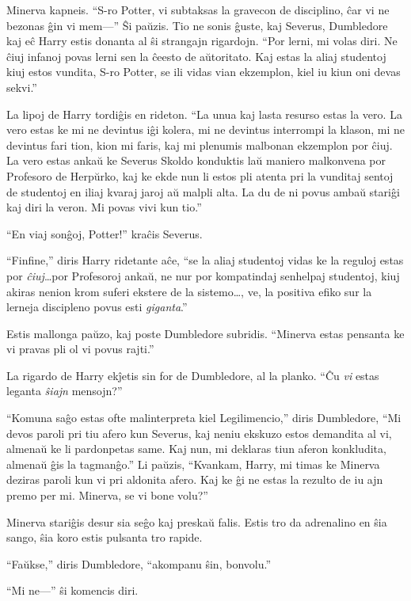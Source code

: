 Minerva kapneis. ``S-ro Potter, vi subtaksas la gravecon de
disciplino, ĉar vi ne bezonas ĝin vi mem—'' Ŝi paŭzis. Tio ne sonis
ĝuste, kaj Severus, Dumbledore kaj eĉ Harry estis donanta al ŝi
strangajn rigardojn. ``Por lerni, mi volas diri. Ne ĉiuj infanoj povas
lerni sen la ĉeesto de aŭtoritato. Kaj estas la aliaj studentoj kiuj
estos vundita, S-ro Potter, se ili vidas vian ekzemplon, kiel iu kiun
oni devas sekvi.''

La lipoj de Harry tordiĝis en rideton. ``La unua kaj lasta resurso
estas la vero. La vero estas ke mi ne devintus iĝi kolera, mi ne
devintus interrompi la klason, mi ne devintus fari tion, kion mi
faris, kaj mi plenumis malbonan ekzemplon por ĉiuj. La vero estas
ankaŭ ke Severus Skoldo konduktis laŭ maniero malkonvena por Profesoro
de Herpŭrko, kaj ke ekde nun li estos pli atenta pri la vunditaj
sentoj de studentoj en iliaj kvaraj jaroj aŭ malpli alta. La du de ni
povus ambaŭ stariĝi kaj diri la veron. Mi povas vivi kun tio.''

``En viaj sonĝoj, Potter!'' kraĉis Severus.

``Finfine,'' diris Harry ridetante aĉe, ``se la aliaj studentoj vidas
ke la reguloj estas por \emph{ĉiuj}\ldots por Profesoroj ankaŭ, ne
nur por kompatindaj senhelpaj studentoj, kiuj akiras nenion krom
suferi ekstere de la sistemo\ldots, ve, la positiva efiko sur la
lerneja discipleno povus esti \emph{giganta}.''

Estis mallonga paŭzo, kaj poste Dumbledore subridis. ``Minerva estas
pensanta ke vi pravas pli ol vi povus rajti.''

La rigardo de Harry ekĵetis sin for de Dumbledore, al la planko. ``Ĉu
\emph{vi} estas leganta \emph{ŝiajn} mensojn?''

``Komuna saĝo estas ofte malinterpreta kiel Legilimencio,'' diris
Dumbledore, ``Mi devos paroli pri tiu afero kun Severus, kaj neniu
ekskuzo estos demandita al vi, almenaŭ ke li pardonpetas same. Kaj
nun, mi deklaras tiun aferon konkludita, almenaŭ ĝis la tagmanĝo.'' Li
paŭzis, ``Kvankam, Harry, mi timas ke Minerva deziras paroli kun vi
pri aldonita afero. Kaj ke ĝi ne estas la rezulto de iu ajn premo per
mi. Minerva, se vi bone volu?''

Minerva stariĝis desur sia seĝo kaj preskaŭ falis. Estis tro da
adrenalino en ŝia sango, ŝia koro estis pulsanta tro rapide.

``Faŭkse,'' diris Dumbledore, ``akompanu ŝin, bonvolu.''

``Mi ne—'' ŝi komencis diri.

